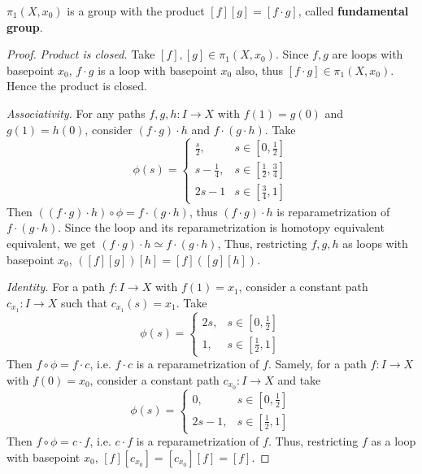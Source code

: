 \begin{prop} $\pi_1(X,x_0)$ is a group with the product $[f][g]=[f\cdot g]$, called \textbf{fundamental group}.
\end{prop}
\begin{proof} \textit{Product is closed.} Take $[f],[g]\in\pi_1(X,x_0)$. Since $f,g$ are loops with basepoint $x_0$, $f\cdot g$ is a loop with basepoint $x_0$ also, thus $[f\cdot g]\in\pi_1(X,x_0)$. Hence the product is closed.

\textit{Associativity.} For any paths $f,g,h:I\rightarrow X$ with $f(1)=g(0)$ and $g(1)=h(0)$, consider $(f\cdot g)\cdot h$ and $f\cdot(g\cdot h)$. Take
\begin{equation}
\phi(s)=\begin{cases}
\frac{s}{2},&s\in [0,\frac{1}{2}]\\
s-\frac{1}{4}, &s\in [\frac{1}{2},\frac{3}{4}]\\
2s-1&s\in [\frac{3}{4},1]
\end{cases}
\end{equation}
Then $((f\cdot g)\cdot h)\circ \phi=f\cdot (g\cdot h)$, thus $(f\cdot g)\cdot h$ is reparametrization of $f\cdot(g\cdot h)$. Since the loop and its reparametrization is homotopy equivalent equivalent, we get $(f\cdot g)\cdot h\simeq f\cdot(g\cdot h)$, Thus, restricting $f,g,h$ as loops with basepoint $x_0$, $([f][g])[h]=[f]([g][h])$.

\textit{Identity.} For a path $f:I\rightarrow X$ with $f(1)=x_1$, consider a constant path $c_{x_1}:I\rightarrow X$ such that $c_{x_1}(s)=x_1$. Take
\begin{equation}
\phi(s)=\begin{cases}
2s,&s\in[0,\frac{1}{2}]\\
1,&s\in[\frac{1}{2},1]
\end{cases}
\end{equation}
Then $f\circ \phi=f\cdot c$, i.e. $f\cdot c$ is a reparametrization of $f$. Samely, for a path $f:I\rightarrow X$ with $f(0)=x_0$, consider a constant path $c_{x_0}:I\rightarrow X$ and take
\begin{equation}
\phi(s)=\begin{cases}
0,&s\in[0,\frac{1}{2}]\\
2s-1,&s\in[\frac{1}{2},1]
\end{cases}
\end{equation}
Then $f\circ \phi=c\cdot f$, i.e. $c\cdot f$ is a reparametrization of $f$. Thus, restricting $f$ as a loop with basepoint $x_0$, $[f][c_{x_0}]=[c_{x_0}][f]=[f]$.


\end{proof}
